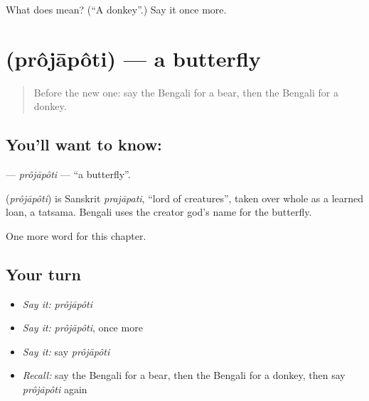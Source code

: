 \begin{tcolorbox}[breakable,colback=teal!4,colframe=teal!35!black,title={Before you move on}]
What does  mean? (\textquotedblleft{}A donkey\textquotedblright{}.) Say it once more.
\end{tcolorbox}
\section[\texorpdfstring{\bn{প্রজাপতি} (prôjāpôti)}{প্রজাপতি (prôjāpôti)}]{ (prôjāpôti) — a butterfly}

\label{lesson:BN-C71-projapoti}



\begin{quote}
Before the new one: say the Bengali for a bear, then the Bengali for a donkey.
\end{quote}

\subsection*{You'll want to know: }
\textbf{} — \emph{prôjāpôti} — \textquotedblleft{}a butterfly\textquotedblright{}.

\begin{cousinweb}
\textbf{} (\emph{prôjāpôti}) is Sanskrit \emph{prajāpati}, \textquotedblleft{}lord of creatures\textquotedblright{}, taken over whole as a learned loan, a tatsama. Bengali uses the creator god's name for the butterfly.
\end{cousinweb}

\begin{grammarlens}[title={What you've built}]
One more word for this chapter.
\end{grammarlens}

\subsection*{Your turn}
\begin{itemize}
\raggedright
  \item \emph{Say it:} \emph{prôjāpôti}
  \item \emph{Say it:} \emph{prôjāpôti}, once more
  \item \emph{Say it:} say \emph{prôjāpôti}
  \item \emph{Recall:} say the Bengali for a bear, then the Bengali for a donkey, then say \emph{prôjāpôti} again
\end{itemize}

